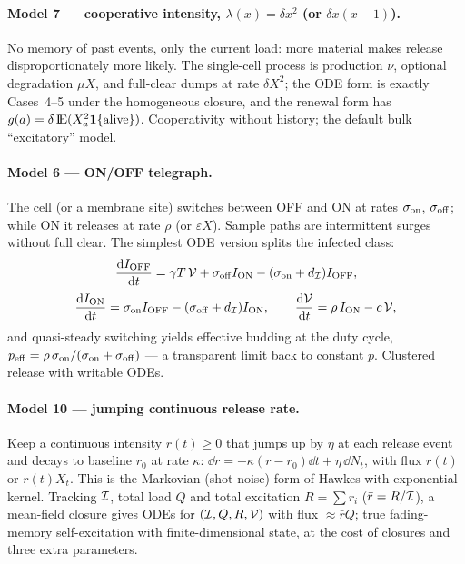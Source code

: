 \paragraph{Model 7 --- cooperative intensity, $\lambda(x)=\delta x^2$
(or $\delta x(x-1)$).} No memory of past events, only the current load:
more material makes release disproportionately more likely. The single-cell
process is production $\nu$, optional degradation $\mu X$, and full-clear
dumps at rate $\delta X^2$; the ODE form is exactly Cases~4--5 under the
homogeneous closure, and the renewal form has
$g(a)=\delta\,{\rm I}\!{\rm E}(X_a^2\mathbf1\{\text{alive}\})$. Cooperativity without
history; the default bulk ``excitatory'' model.

\paragraph{Model 6 --- ON/OFF telegraph.} The cell (or a membrane site)
switches between OFF and ON at rates $\sigma_{\rm on}$, $\sigma_{\rm off}$;
while ON it releases at rate $\rho$ (or $\varepsilon X$). Sample paths are
intermittent surges without full clear. The simplest ODE version splits the
infected class:
\begin{equation}
\displaystyle\frac{{\rm d} I_{\rm OFF}}{{\rm d} t}=\gamma T\,\mathcal{V}+\sigma_{\rm off}I_{\rm ON}
-(\sigma_{\rm on}+d_{\mathcal{I}})I_{\rm OFF},
\end{equation}
\begin{equation}
\displaystyle\frac{{\rm d} I_{\rm ON}}{{\rm d} t}=\sigma_{\rm on}I_{\rm OFF}
-(\sigma_{\rm off}+d_{\mathcal{I}})I_{\rm ON},
\qquad
\displaystyle\frac{{\rm d} \mathcal{V}}{{\rm d} t}=\rho\,I_{\rm ON}-c\,\mathcal{V},
\end{equation}
and quasi-steady switching yields effective budding at the duty cycle,
$p_{\rm eff}=\rho\,\sigma_{\rm on}/(\sigma_{\rm on}+\sigma_{\rm off})$ ---
a transparent limit back to constant $p$. Clustered release with writable
ODEs.

\paragraph{Model 10 --- jumping continuous release rate.} Keep a continuous
intensity $r(t)\ge0$ that jumps up by $\eta$ at each release event and
decays to baseline $r_0$ at rate $\kappa$:
$\dd r=-\kappa(r-r_0)\dd t+\eta\,\dd N_t$, with flux $r(t)$ or $r(t)X_t$.
This is the Markovian (shot-noise) form of Hawkes with exponential kernel.
Tracking $\mathcal{I}$, total load $Q$ and total excitation $R=\sum r_i$
($\bar r=R/\mathcal{I}$), a mean-field closure gives ODEs for
$(\mathcal{I},Q,R,\mathcal{V})$ with flux $\approx\bar r Q$; true fading-memory
self-excitation with finite-dimensional state, at the cost of closures and
three extra parameters.

